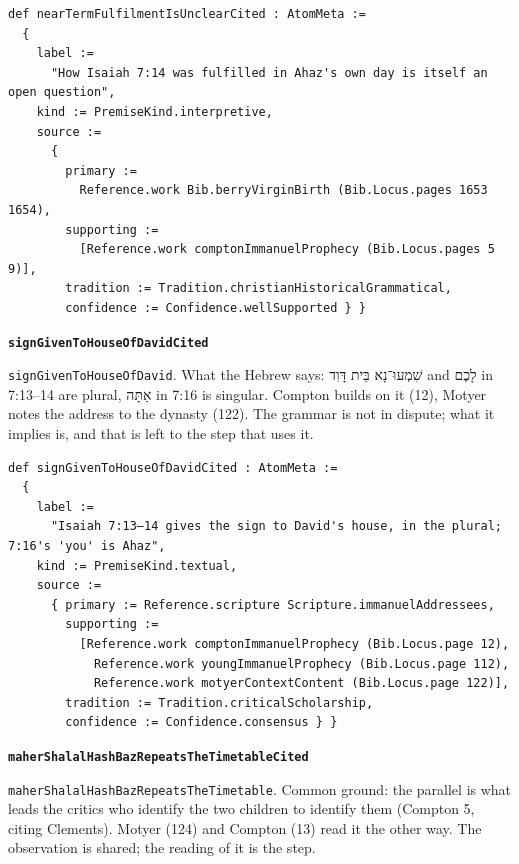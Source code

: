 \documentclass[11pt]{article}
\begin{document}
{\small\begin{verbatim}
def nearTermFulfilmentIsUnclearCited : AtomMeta :=
  {
    label :=
      "How Isaiah 7:14 was fulfilled in Ahaz's own day is itself an open question",
    kind := PremiseKind.interpretive,
    source :=
      {
        primary :=
          Reference.work Bib.berryVirginBirth (Bib.Locus.pages 1653 1654),
        supporting :=
          [Reference.work comptonImmanuelProphecy (Bib.Locus.pages 5 9)],
        tradition := Tradition.christianHistoricalGrammatical,
        confidence := Confidence.wellSupported } }
\end{verbatim}}
\par\medskip\noindent\textbf{\texttt{sign\allowbreak{}Given\allowbreak{}To\allowbreak{}House\allowbreak{}Of\allowbreak{}David\allowbreak{}Cited}}\par\nobreak\noindent
\texttt{sign\allowbreak{}Given\allowbreak{}To\allowbreak{}House\allowbreak{}Of\allowbreak{}David}. What the Hebrew says: שִׁמְעוּ־נָא בֵּית דָּוִד and לָכֶם in 7:13–14 are plural, אַתָּה in 7:16 is singular. Compton builds on it (12), Motyer notes the address to the dynasty (122). The grammar is not in dispute; what it implies is, and that is left to the step that uses it.

{\small\begin{verbatim}
def signGivenToHouseOfDavidCited : AtomMeta :=
  {
    label :=
      "Isaiah 7:13–14 gives the sign to David's house, in the plural; 7:16's 'you' is Ahaz",
    kind := PremiseKind.textual,
    source :=
      { primary := Reference.scripture Scripture.immanuelAddressees,
        supporting :=
          [Reference.work comptonImmanuelProphecy (Bib.Locus.page 12),
            Reference.work youngImmanuelProphecy (Bib.Locus.page 112),
            Reference.work motyerContextContent (Bib.Locus.page 122)],
        tradition := Tradition.criticalScholarship,
        confidence := Confidence.consensus } }
\end{verbatim}}
\par\medskip\noindent\textbf{\texttt{maher\allowbreak{}Shalal\allowbreak{}Hash\allowbreak{}Baz\allowbreak{}Repeats\allowbreak{}The\allowbreak{}Timetable\allowbreak{}Cited}}\par\nobreak\noindent
\texttt{maher\allowbreak{}Shalal\allowbreak{}Hash\allowbreak{}Baz\allowbreak{}Repeats\allowbreak{}The\allowbreak{}Timetable}. Common ground: the parallel is what leads the critics who identify the two children to identify them (Compton 5, citing Clements). Motyer (124) and Compton (13) read it the other way. The observation is shared; the reading of it is the step.
\end{document}

